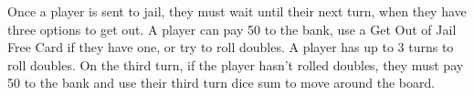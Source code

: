 Once a player is sent to jail, they must wait until their next turn, when they have three options to get out. A player can pay 50 to the bank, use a Get Out of Jail Free Card if they have one, or try to roll doubles. A player has up to 3 turns to roll doubles. On the third turn, if the player hasn’t rolled doubles, they must pay 50 to the bank and use their third turn dice sum to move around the board.